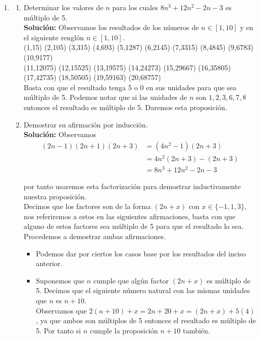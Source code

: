 \documentclass[10pt,letterpaper,fleqn]{article}
\begin{document}
    \begin{enumerate}

        \item \begin{enumerate}

            \item Determinar los valores de $n$ para los cuales $8n^3 + 12n^2 - 2n - 3$ es múltiplo de 5.\\
            \textbf{Solución: } Observamos los resultados de los números de $n\in [1,10]$ y en el siguiente renglón $n\in[1,10]$. \\
            (1,15) (2,105) (3,315) (4,693) (5,1287) (6,2145) (7,3315) (8,4845) (9,6783) (10,9177) \\ 
            (11,12075) (12,15525) (13,19575) (14,24273) (15,29667) (16,35805) (17,42735) (18,50505) (19,59163) (20,68757) \\ 
            Basta con que el resultado tenga 5 o 0 en sus unidades para que sea múltiplo de 5. Podemos notar que si las unidades de $n$ son $1,2,3,6,7,8$ entonces el resultado es múltiplo de 5. Daremos esta proposición.
            
            \item Demostrar su afirmación por inducción.\\
            \textbf{Solución: } Observamos
            \begin{equation*}
                \begin{split}
                    (2n - 1)(2n + 1)(2n + 3) & = (4n^2-1)(2n+3)\\
                                             & = 4n^2(2n+3) - (2n+3) \\
                                             & = 8n^3 + 12n^2 - 2n -3
                \end{split}
            \end{equation*}

            por tanto usaremos esta factorización para demostrar inductivamente nuestra proposición. \\
            Decimos que los factores son de la forma $(2n+x)$ con $x\in\{-1,1,3\}$, nos referiremos a estos en las siguientes afirmaciones, basta con que alguno de estos factores sea múltiplo de 5 para que el resultado lo sea. Procedemos a demostrar ambas afirmaciones.
            \begin{itemize}
                \item Podemos dar por ciertos los casos base por los resultados del inciso anterior.
                \item Suponemos que $n$ cumple que algún factor $(2n+x)$ es múltiplo de 5. Decimos que el siguiente número natural con las mismas unidades que $n$ es $n+10$. \\
                Observamos que $2(n+10)+x=2n+20+x=(2n+x)+5(4)$, ya que ambos son múltiplos de 5 entonces el resultado es múltiplo de 5. Por tanto si $n$ cumple la proposición $n+10$ también.
            \end{itemize}


\end{enumerate}
\end{enumerate}
\end{document}
